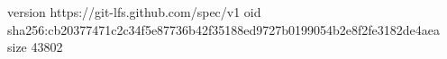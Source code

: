 version https://git-lfs.github.com/spec/v1
oid sha256:cb20377471c2c34f5e87736b42f35188ed9727b0199054b2e8f2fe3182de4aea
size 43802
